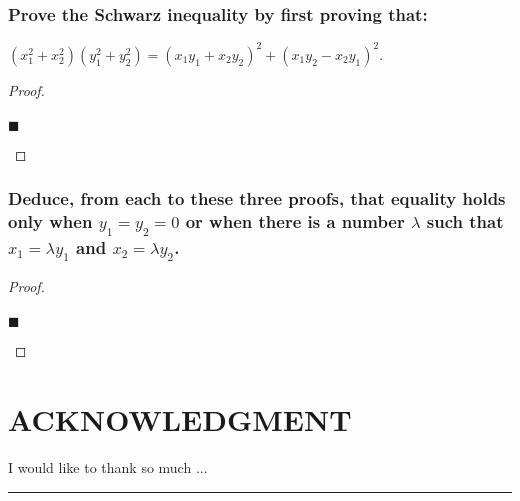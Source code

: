 \documentclass[letterpaper, 10 pt, conference]{ieeeconf}  %
\begin{document}
\begin{mdframed}
\subsubsection{\textbf{Prove the Schwarz inequality by first proving that:}}
\begin{center}
    $(x_1^2 + x_2^2)(y_1^2 + y_2^2) = (x_1y_1 + x_2y_2)^2 + (x_1y_2 - x_2y_1)^2$.
\end{center}
\end{mdframed}

\begin{proof}
\begin{align}
    
\end{align}
\begin{flushright}
$\blacksquare$
\end{flushright}
\end{proof}

\begin{mdframed}
\subsubsection{\textbf{Deduce, from each to these three proofs, that equality holds only when $y_1 = y_2 = 0$ or when there is a number $\lambda$ such that $x_1 = \lambda y_1$ and $x_2 = \lambda y_2$.}}
\end{mdframed}

\begin{proof}
\begin{align}
    
\end{align}
\begin{flushright}
$\blacksquare$
\end{flushright}
\end{proof}

\newpage

\section*{ACKNOWLEDGMENT}
I would like to thank so much ...

\noindent\rule{8cm}{0.4pt}
\end{document}
